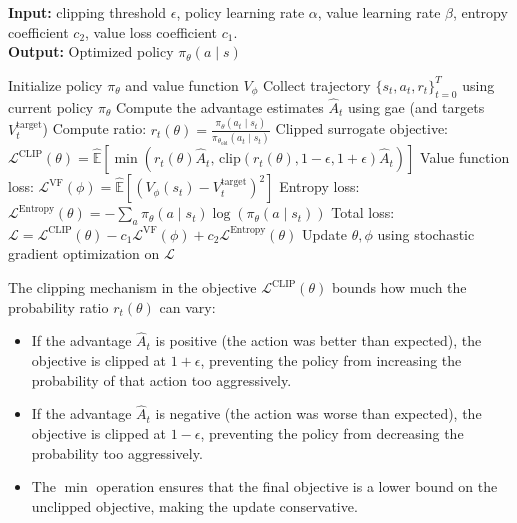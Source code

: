 \begin{algorithm}[H]
\caption{Proximal Policy Optimization}\label{alg:ppo}
\textbf{Input:} clipping threshold $\epsilon$, policy learning rate $\alpha$, value learning rate $\beta$, entropy coefficient $c_2$, value loss coefficient $c_1$. \\
\textbf{Output:} Optimized policy $\pi_\theta(a \mid s)$
\begin{algorithmic}
\State Initialize policy $\pi_\theta$ and value function $V_\phi$
    \State Collect trajectory $\{s_t, a_t, r_t\}_{t=0}^T$ using current policy $\pi_\theta$
    \State Compute the advantage estimates $\hat{A}_t$ using \gls{gae} (and targets $V_t^{\text{target}}$)
            \State Compute ratio: $r_t(\theta) = \frac{\pi_\theta(a_t \mid s_t)}{\pi_{\theta_{\text{old}}}(a_t \mid s_t)}$
            \State Clipped surrogate objective:
            \State $\mathcal{L}^{\text{CLIP}}(\theta) = \hat{\mathbb{E}} \left[ \min\left( r_t(\theta) \hat{A}_t, \, \text{clip}(r_t(\theta), 1 - \epsilon, 1 + \epsilon)\hat{A}_t \right) \right]$
            \State Value function loss: $\mathcal{L}^{\text{VF}}(\phi) = \hat{\mathbb{E}} \left[ \left(V_\phi(s_t) - V_t^{\text{target}}\right)^2 \right]$
            \State Entropy loss: $\mathcal{L}^{\text{Entropy}}(\theta) = - \sum_a \pi_\theta(a \mid s_t)\log(\pi_\theta(a \mid s_t))$
            \State Total loss: $\mathcal{L} = \mathcal{L}^{\text{CLIP}}(\theta) - c_1 \mathcal{L}^{\text{VF}}(\phi) + c_2 \mathcal{L}^{\text{Entropy}}(\theta)$
            \State Update $\theta, \phi$ using stochastic gradient optimization on $\mathcal{L}$
        \EndFor
    \EndFor
\EndFor
\end{algorithmic}
\end{algorithm}


The clipping mechanism in the objective $\mathcal{L}^{\text{CLIP}}(\theta)$ bounds how much the probability ratio $r_t(\theta)$ can vary:
\begin{itemize}
    \item If the advantage $\hat{A}_t$ is positive (the action was better than expected), the objective is clipped at $1 + \epsilon$, preventing the policy from increasing the probability of that action too aggressively.
    \item If the advantage $\hat{A}_t$ is negative (the action was worse than expected), the objective is clipped at $1 - \epsilon$, preventing the policy from decreasing the probability too aggressively.
    \item The $\min$ operation ensures that the final objective is a lower bound on the unclipped objective, making the update conservative.
\end{itemize}

